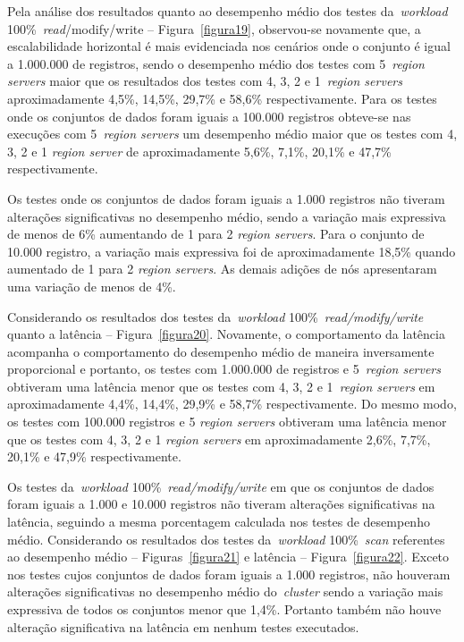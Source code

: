 \documentclass[12pt]{article}
\begin{document}
Pela análise dos resultados quanto ao desempenho médio dos testes da~\emph{workload} 100\%~\emph{read}/modify/write -- Figura~\ref{figura19}, observou-se novamente que, a escalabilidade horizontal é mais evidenciada nos cenários onde o conjunto é igual a 1.000.000 de registros, sendo o desempenho médio dos testes com 5~\emph{region servers} maior que os resultados dos testes com 4, 3, 2 e 1~\emph{region servers} aproximadamente 4,5\%, 14,5\%, 29,7\% e 58,6\% respectivamente. Para os testes onde os conjuntos de dados foram iguais a 100.000 registros obteve-se nas execuções com 5~\emph{region servers} um desempenho médio maior que os testes com 4, 3, 2 e 1 \emph{region server} de aproximadamente 5,6\%, 7,1\%, 20,1\% e 47,7\% respectivamente.

Os testes onde os conjuntos de dados foram iguais a 1.000 registros não tiveram alterações significativas no desempenho médio, sendo a variação mais expressiva de menos de 6\% aumentando de 1 para 2 \emph{region servers}. Para o conjunto de 10.000 registro, a variação mais expressiva foi de aproximadamente 18,5\% quando aumentado de 1 para 2 \emph{region servers}. As demais adições de nós apresentaram uma variação de menos de 4\%.

Considerando os resultados dos testes da~\emph{workload} 100\%~\emph{read/modify/write} quanto a latência -- Figura~\ref{figura20}. Novamente, o comportamento da latência acompanha o comportamento do desempenho médio de maneira inversamente proporcional e portanto, os testes com 1.000.000 de registros e 5~\emph{region servers} obtiveram uma latência menor que os testes com 4, 3, 2 e 1~\emph{region servers} em aproximadamente 4,4\%, 14,4\%, 29,9\% e 58,7\% respectivamente. Do mesmo modo, os testes com 100.000 registros e 5 \emph{region servers} obtiveram uma latência menor que os testes com 4, 3, 2 e 1 \emph{region servers} em aproximadamente 2,6\%, 7,7\%, 20,1\% e 47,9\% respectivamente.

Os testes da~\emph{workload} 100\%~\emph{read/modify/write} em que os conjuntos de dados foram iguais a 1.000 e 10.000 registros não tiveram alterações significativas na latência, seguindo a mesma porcentagem calculada nos testes de desempenho médio. Considerando os resultados dos testes da~\emph{workload} 100\%~\emph{scan} referentes ao desempenho médio -- Figuras~\ref{figura21} e latência -- Figura~\ref{figura22}. Exceto nos testes cujos conjuntos de dados foram iguais a 1.000 registros, não houveram alterações significativas no desempenho médio do~\emph{cluster} sendo a variação mais expressiva de todos os conjuntos menor que 1,4\%. Portanto também não houve alteração significativa na latência em nenhum testes executados.
\end{document}
